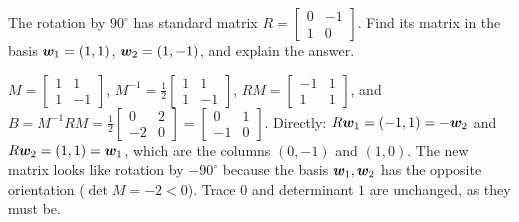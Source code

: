\begin{exercise}\label{exr:u35-rotation}
The rotation by $90^\circ$ has standard matrix $R=\left[\begin{smallmatrix}0&-1\\1&0\end{smallmatrix}\right]$. Find its
matrix in the basis $\boldsymbol{w}_1=(1,1)$, $\boldsymbol{w}_2=(1,-1)$, and explain the answer.
\end{exercise}
\begin{solution}
$M=\left[\begin{smallmatrix}1&1\\1&-1\end{smallmatrix}\right]$, $M^{-1}=\tfrac12\left[\begin{smallmatrix}1&1\\1&-1\end{smallmatrix}\right]$,
$RM=\left[\begin{smallmatrix}-1&1\\1&1\end{smallmatrix}\right]$, and
$B=M^{-1}RM=\tfrac12\left[\begin{smallmatrix}0&2\\-2&0\end{smallmatrix}\right]=\left[\begin{smallmatrix}0&1\\-1&0\end{smallmatrix}\right]$.
Directly: $R\boldsymbol{w}_1=(-1,1)=-\boldsymbol{w}_2$ and $R\boldsymbol{w}_2=(1,1)=\boldsymbol{w}_1$, which are the columns $(0,-1)$ and $(1,0)$. The
new matrix looks like rotation by $-90^\circ$ because the basis $\boldsymbol{w}_1,\boldsymbol{w}_2$ has the opposite
orientation ($\det M=-2<0$). Trace $0$ and determinant $1$ are unchanged, as they must be.
\end{solution}
